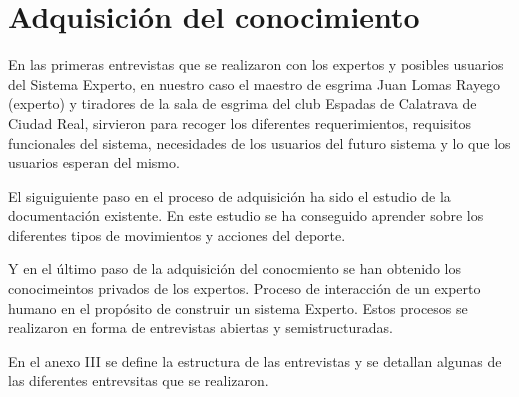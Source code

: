 \section{Adquisición del conocimiento}


En las primeras entrevistas que se realizaron con los expertos y posibles usuarios
 del Sistema Experto, en nuestro caso el maestro de esgrima Juan Lomas Rayego (experto)
 y tiradores de la sala de esgrima del club Espadas de Calatrava de Ciudad Real, sirvieron
 para recoger los diferentes requerimientos, requisitos funcionales del sistema, necesidades
 de los usuarios del futuro sistema y lo que los usuarios esperan del mismo.

El siguiguiente paso en el proceso de adquisición ha sido el estudio de la documentación
 existente. En este estudio se ha conseguido aprender sobre los diferentes tipos de movimientos
 y acciones del deporte.

Y en el último paso de la adquisición del conocmiento se han obtenido los conocimeintos privados
 de los expertos. Proceso de interacción de un experto humano en el propósito de construir un
 sistema Experto. Estos procesos se realizaron en forma de entrevistas abiertas y semistructuradas.

En el anexo III se define la estructura de las entrevistas y se detallan algunas de las
 diferentes entrevsitas que se realizaron.


